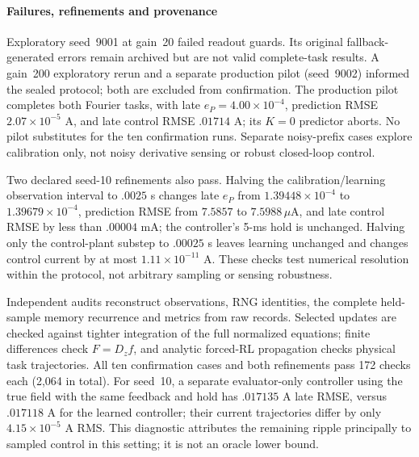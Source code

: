 \paragraph{Failures, refinements and provenance}
Exploratory seed~9001 at gain~20 failed readout guards. Its original
fallback-generated errors remain archived but are not valid complete-task
results. A gain~200 exploratory rerun and a separate production pilot (seed~9002)
informed the sealed protocol; both are excluded from confirmation. The
production pilot completes both Fourier tasks, with late $e_P=4.00\times10^{-4}$,
prediction RMSE $2.07\times10^{-5}$ A, and late control RMSE $.01714$ A;
its $K=0$ predictor aborts. No pilot substitutes for the ten confirmation runs. Separate noisy-prefix cases explore calibration
only, not noisy derivative sensing or robust closed-loop control.

Two declared seed-10 refinements also pass. Halving the calibration/learning
observation interval to $.0025$ s changes late $e_P$ from
$1.39448\times10^{-4}$ to $1.39679\times10^{-4}$, prediction RMSE from $7.5857$ to $7.5988\,\mu$A,
and late control RMSE by less than $.00004$ mA; the controller's 5-ms hold
is unchanged. Halving only the control-plant substep to $.00025$ s leaves
learning unchanged and changes control current by at most $1.11\times10^{-11}$ A. These checks test numerical resolution within the
protocol, not arbitrary sampling or sensing robustness.

Independent audits reconstruct observations, RNG identities, the complete
held-sample memory recurrence and metrics from raw records. Selected updates
are checked against tighter integration of the full normalized equations;
finite differences check $F=D_zf$, and analytic forced-RL propagation checks
physical task trajectories. All ten confirmation cases and both refinements pass 172 checks each
(2,064 in total).
For seed~10, a separate evaluator-only controller using the true field with
the same feedback and hold has $.017135$ A late RMSE, versus $.017118$ A for
the learned controller; their current trajectories differ by only
$4.15\times10^{-5}$ A RMS. This diagnostic attributes the remaining ripple
principally to sampled control in this setting; it is not an oracle lower bound.

